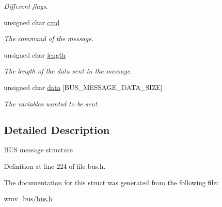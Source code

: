 \begin{CompactItemize}
\begin{CompactList}\small\item\em Different flags. \item\end{CompactList}\item 
\hypertarget{structBUS__MESSAGE_1eef72b04d19f4fa5d1c02e5a60b158c}{
unsigned char \hyperlink{structBUS__MESSAGE_1eef72b04d19f4fa5d1c02e5a60b158c}{cmd}}
\label{structBUS__MESSAGE_1eef72b04d19f4fa5d1c02e5a60b158c}

\begin{CompactList}\small\item\em The command of the message. \item\end{CompactList}\item 
\hypertarget{structBUS__MESSAGE_fa6237d20a437f9f15685a900e014759}{
unsigned char \hyperlink{structBUS__MESSAGE_fa6237d20a437f9f15685a900e014759}{length}}
\label{structBUS__MESSAGE_fa6237d20a437f9f15685a900e014759}

\begin{CompactList}\small\item\em The length of the data sent in the message. \item\end{CompactList}\item 
\hypertarget{structBUS__MESSAGE_9b327c1d1452c31ec7a0012aa83b761e}{
unsigned char \hyperlink{structBUS__MESSAGE_9b327c1d1452c31ec7a0012aa83b761e}{data} \mbox{[}BUS\_\-MESSAGE\_\-DATA\_\-SIZE\mbox{]}}
\label{structBUS__MESSAGE_9b327c1d1452c31ec7a0012aa83b761e}

\begin{CompactList}\small\item\em The variables wanted to be sent. \item\end{CompactList}\end{CompactItemize}


\subsection{Detailed Description}
BUS message structure 

Definition at line 224 of file bus.h.

The documentation for this struct was generated from the following file:\begin{CompactItemize}
\item 
wmv\_\-bus/\hyperlink{bus_8h}{bus.h}\end{CompactItemize}
